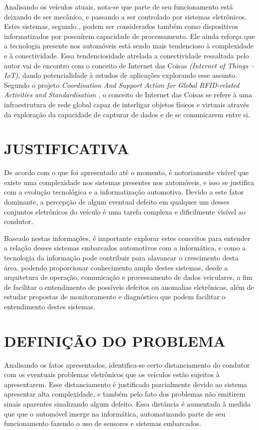 Analisando os veículos atuais, nota-se que parte de seu funcionamento está deixando de ser mecânico, e passando a ser controlado por sistemas eletrônicos. Estes sistemas, segundo , podem ser considerados também como dispositivos informatizados por possuírem capacidade de processamento. Ele ainda reforça que a tecnologia presente nos automóveis está sendo mais tendencioso à complexidade e à conectividade. Essa tendenciosidade atrelada a conectividade ressaltada pelo autor vai de encontro com o conceito de Internet das Coisas \textit{(Internet of Things – IoT)}, dando potencialidade à estudos de aplicações explorando esse assunto. Segundo o projeto \textit{Coordination And Support Action for Global RFID-related Activities and Standardisation \cite{casagras}}, o conceito de Internet das Coisas se refere à uma infraestrutura de rede global capaz de interligar objetos físicos e virtuais através da exploração da capacidade de capturar de dados e de se comunicarem entre si.

\section{JUSTIFICATIVA}
De acordo com o que foi apresentado até o momento, é notoriamente visível que existe uma complexidade nos sistemas presentes nos automóveis, e isso se justifica com a evolução tecnológica e a informatização automotiva. Devido a este fator dominante, a percepção de algum eventual defeito em qualquer um desses conjuntos eletrônicos do veículo é uma tarefa complexa e dificilmente visível ao condutor.

Baseado nestas informações, é importante explorar estes conceitos para entender a relação desses sistemas embarcados automotivos com a informática, e como a tecnologia da informação pode contribuir para alavancar o crescimento desta área, podendo proporcionar conhecimento amplo destes sistemas, desde a arquitetura de operação, comunicação e processamento de dados veiculares, a fim de facilitar o entendimento de possíveis defeitos ou anomalias eletrônicas, além de estudar propostas de monitoramento e diagnóstico que podem facilitar o entendimento destes sistemas.

\section{DEFINIÇÃO DO PROBLEMA}
Analisando os fatos apresentados, identifica-se certo distanciamento do condutor com os eventuais problemas eletrônicos que os veículos estão sujeitos à apresentarem. Esse distanciamento é justificado parcialmente devido ao sistema apresentar alta complexidade, e também pelo fato dos problemas não emitirem sinais aparentes sinalizando algum defeito. Essa distância é aumentada à medida que que o automóvel imerge na informática, automatizando parte de seu funcionamento fazendo o uso de sensores e sistemas embarcados.

